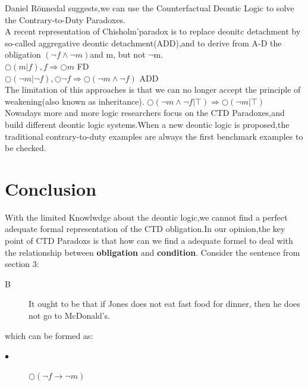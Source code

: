 \documentclass{article}
\begin{document}
Daniel Rönnedal\cite{7} suggests,we can use the Counterfactual Deontic Logic to solve the Contrary-to-Duty Paradoxes.\\
A recent representation of Chisholm'paradox is to replace deonitc detachment by so-called aggregative deontic detachment(ADD),and to derive from A-D the obligation  $(\neg f \wedge \neg m)$and m, but not $\neg $m.\\
$\bigcirc (m|f),f \Rightarrow \bigcirc m $ FD\\
$\bigcirc(\neg m |\neg f),\bigcirc\neg f \Rightarrow \bigcirc(\neg m \wedge \neg f)$ ADD\\
The limitation of this approaches is that we can no longer accept the principle of weakening(also known as inheritance). 
$\bigcirc(\neg m \wedge\neg f|\top) \Rightarrow \bigcirc(\neg m |\top)$\\
Nowadays more and more logic researchers focus on the CTD Paradoxes,and build different deontic logic systems.When a new deontic logic is proposed,the traditional contrary-to-duty examples are always the first benchmark examples to be checked.
\section{Conclusion}
With the limited Knowlwdge about the deontic logic,we cannot find a perfect adequate formal representation of the CTD obligation.In our opinion,the key point of CTD Paradoxs is that how can we find a adequate formel to deal with the relationship between \textbf{obligation} and \textbf{condition}.
Consider the sentence from section 3:
\begin{description}
\item[B] It ought to be that if Jones does not eat fast food for dinner, then he does not go to McDonald’s.
\end{description}
which can be formed as:
\begin{description}
\item[$\bullet $]$\bigcirc (\neg f \rightarrow\neg m)$
\end{description}
\end{document}
